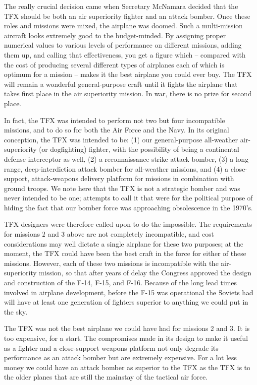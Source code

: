 The really crucial decision came when Secretary McNamara decided that the TFX should be both an air superiority fighter and an attack bomber. Once these roles and missions were mixed, the airplane was doomed. Such a multi-mission aircraft looks extremely good to the budget-minded. By assigning proper numerical values to various levels of performance on different missions, adding them up, and calling that effectiveness, you get a figure which -- compared with the cost of producing several different types of airplanes each of which is optimum for a mission -- makes it the best airplane you could ever buy. The TFX will remain a wonderful general-purpose craft until it fights the airplane that takes first place in the air superiority mission. In war, there is no prize for second place.

In fact, the TFX was intended to perform not two but four incompatible missions, and to do so for both the Air Force and the Navy. In its original conception, the TFX was intended to be: (1) our general-purpose all-weather air-superiority (or dogfighting) fighter, with the possibility of being a continental defense interceptor as well, (2) a reconnaissance-strike attack bomber, (3) a long-range, deep-interdiction attack bomber for all-weather missions, and (4) a close-support, attack-weapons delivery platform for missions in combination with ground troops. We note here that the TFX is not a strategic bomber and was never intended to be one; attempts to call it that were for the political purpose of hiding the fact that our bomber force was approaching obsolescence in the 1970's.

TFX designers were therefore called upon to do the impossible. The requirements for missions 2 and 3 above are not completely incompatible, and cost considerations may well dictate a single airplane for these two purposes; at the moment, the TFX could have been the best craft in the force for either of these missions. However, each of these two missions is incompatible with the air-superiority mission, so that after years of delay the Congress approved the design and construction of the F-14, F-15, and F-16. Because of the long lead times involved in airplane development, before the F-15 was operational the Soviets had will have at least one generation of fighters superior to anything we could put in the sky.

The TFX was not the best airplane we could have had for missions 2 and 3. It is too expensive, for a start. The compromises made in its design to make it useful as a fighter and a close-support weapons platform not only degrade its performance as an attack bomber but are extremely expensive. For a lot less money we could have an attack bomber as superior to the TFX as the TFX is to the older planes that are still the mainstay of the tactical air force.

